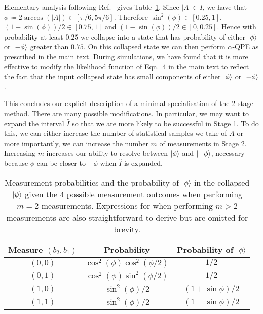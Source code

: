 \documentclass[twocolumn,
 reprint,
 amsmath,amssymb,
 aps,
 floatfix,
superscriptaddress
]{revtex4-1}
\begin{document}
Elementary analysis following Ref.~\cite{Dobsicek2007} gives Table~\ref{m2_specialisation}. Since $|A|\in I $, we have that $\phi \coloneqq {2\arccos{(|A|)}}\in[\pi/6,5\pi/6]$. Therefore $\sin^2(\phi) \in [0.25,1]$, $(1+\sin(\phi))/2\in[0.75,1]$ and $(1-\sin(\phi))/2\in[0,0.25]$. Hence with probability at least $0.25$ we collapse into a state that has probability of either $\Ket{\phi}$ or $\Ket{-\phi}$ greater than $0.75$. On this collapsed state we can then perform $\alpha$-QPE as prescribed in the main text. During simulations, we have found that it is more effective to modify the likelihood function of Eqn.~4 in the main text to reflect the fact that the input collapsed state has small components of either $\Ket{\phi}$ or $\Ket{-\phi}$.

This concludes our explicit description of a minimal specialisation of the 2-stage method. There are many possible modifications. In particular, we may want to expand the interval $\hat{I}$ so that we are more likely to be successful in Stage 1. To do this, we can either increase the number of statistical samples we take of $A$ or more importantly, we can increase the number $m$ of measurements in Stage 2. Increasing $m$ increases our ability to resolve between $\Ket{\phi}$ and $\Ket{-\phi}$, necessary because $\phi$ can be closer to $-\phi$ when $\hat{I}$ is expanded.

\begin{table}[H]
    \centering
    \begin{tabular}[b]{c|c|c}
        Measure $(b_2,b_1)$ & Probability & Probability of $\Ket{\phi}$ \tabularnewline \hline 
        $(0,0)$ & $\cos^2(\phi)\cos^2(\phi/2)$ & $1/2$ \tabularnewline 
        $(0,1)$ & $\cos^2(\phi)\sin^2(\phi/2)$ & $1/2$ \tabularnewline
        $(1,0)$ & $\sin^2(\phi)/2$ & 
        $(1+\sin{\phi})/2$
        \tabularnewline
        $(1,1)$ & $\sin^2(\phi)/2$ & $(1-\sin{\phi})/2$
    \end{tabular}
    \caption{Measurement probabilities and the probability of $\ket{\phi}$ in the collapsed $\Ket{\psi}$ given the 4 possible measurement outcomes when performing $m=2$ measurements. Expressions for when performing $m>2$ measurements are also straightforward to derive but are omitted for brevity.} 
    \label{m2_specialisation}
\end{table}

\FloatBarrier
\end{document}

